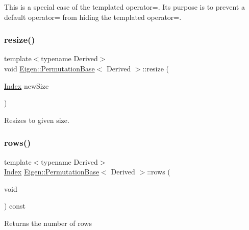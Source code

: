 This is a special case of the templated operator=. Its purpose is to prevent a default operator= from hiding the templated operator=. \mbox{\label{class_eigen_1_1_permutation_base_a0e0fda6e84d69e02432e4770359bb532}} 
\subsubsection{\texorpdfstring{resize()}{resize()}}
{\footnotesize\ttfamily template$<$typename Derived$>$ \\
void \mbox{\hyperlink{class_eigen_1_1_permutation_base}{Eigen\+::\+Permutation\+Base}}$<$ Derived $>$\+::resize (\begin{DoxyParamCaption}\item[{\mbox{\hyperlink{struct_eigen_1_1_eigen_base_a554f30542cc2316add4b1ea0a492ff02}{Index}}}]{new\+Size }\end{DoxyParamCaption})\hspace{0.3cm}{\ttfamily [inline]}}

Resizes to given size. \mbox{\label{class_eigen_1_1_permutation_base_acd7ed28ee514287f933de8467768925b}} 
\subsubsection{\texorpdfstring{rows()}{rows()}}
{\footnotesize\ttfamily template$<$typename Derived$>$ \\
\mbox{\hyperlink{struct_eigen_1_1_eigen_base_a554f30542cc2316add4b1ea0a492ff02}{Index}} \mbox{\hyperlink{class_eigen_1_1_permutation_base}{Eigen\+::\+Permutation\+Base}}$<$ Derived $>$\+::rows (\begin{DoxyParamCaption}\item[{void}]{ }\end{DoxyParamCaption}) const\hspace{0.3cm}{\ttfamily [inline]}}

\begin{DoxyReturn}{Returns}
the number of rows 
\end{DoxyReturn}
\mbox{\label{class_eigen_1_1_permutation_base_a6805bb75fd7966ea71895c24ff196444}} 
